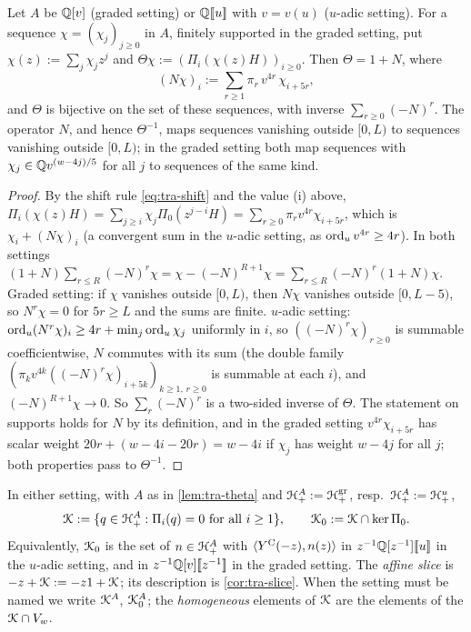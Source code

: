 \begin{lem}
\label{lem:tra-theta}
Let $A$ be $\mathbb{Q}[v]$ (graded setting) or $\mathbb{Q}[\![ u ]\!]$ with $v = v(u)$ ($u$-adic setting). For a sequence $\chi = (\chi_j)_{j\geq 0}$ in $A$, finitely supported in the graded setting, put $\chi(z) := \sum_j\chi_jz^j$ and $\Theta\chi := (\Pi_i(\chi(z)H))_{i\geq 0}$. Then $\Theta = 1+N$, where
\[
(N\chi)_i := \sum_{r\geq 1}\pi_r\,v^{4r}\,\chi_{i+5r},
\]
and $\Theta$ is bijective on the set of these sequences, with inverse $\sum_{r\geq 0}(-N)^r$. The operator $N$, and hence $\Theta^{-1}$, maps sequences vanishing outside $[0,L)$ to sequences vanishing outside $[0,L)$; in the graded setting both map sequences with $\chi_j\in\mathbb{Q} v^{(w-4j)/5}$ for all $j$ to sequences of the same kind.
\end{lem}

\begin{proof}
By the shift rule \eqref{eq:tra-shift} and the value (i) above, $\Pi_i(\chi(z)H) =\sum_{j\geq i}\chi_j\Pi_0(z^{j-i}H) = \sum_{r\geq 0}\pi_rv^{4r}\chi_{i+5r}$, which is $\chi_i+(N\chi)_i$ (a convergent sum in the $u$-adic setting, as $\operatorname{ord}_uv^{4r}\geq 4r$). In both settings $(1+N)\sum_{r\leq R}(-N)^r\chi = \chi-(-N)^{R+1}\chi = \sum_{r\leq R}(-N)^r(1+N)\chi$. Graded setting: if $\chi$ vanishes outside $[0,L)$, then $N\chi$ vanishes outside $[0,L-5)$, so $N^r\chi = 0$ for $5r\geq L$ and the sums are finite. $u$-adic setting: $\operatorname{ord}_u(N^r\chi)_i\geq 4r+\min_j\operatorname{ord}_u\chi_j$ uniformly in $i$, so $((-N)^r\chi)_{r\geq 0}$ is summable coefficientwise, $N$ commutes with its sum (the double family $(\pi_kv^{4k}((-N)^r\chi)_{i+5k})_{k\geq 1,\,r\geq 0}$ is summable at each $i$), and $(-N)^{R+1}\chi\to 0$. So $\sum_r(-N)^r$ is a two-sided inverse of $\Theta$. The statement on supports holds for $N$ by its definition, and in the graded setting $v^{4r}\chi_{i+5r}$ has scalar weight $20r+(w-4i-20r) = w-4i$ if $\chi_j$ has weight $w-4j$ for all $j$; both properties pass to $\Theta^{-1}$.
\end{proof}

\begin{defn}
\label{def:tra-slice}
In either setting, with $A$ as in \cref{lem:tra-theta} and $\mathcal{H}^A_+ := \mathcal{H}^{\mathrm{gr}}_+$, resp.\ $\mathcal{H}^A_+ := \mathcal{H}^u_+$,
\begin{equation}
\label{eq:tra-slice}
\mathcal{K} := \{q\in\mathcal{H}^A_+ : \Pi_i(q) = 0\ \text{for all } i\geq 1\},\qquad \mathcal{K}_{0} := \mathcal{K}\cap\ker\Pi_0 .
\end{equation}
Equivalently, $\mathcal{K}_{0}$ is the set of $n\in\mathcal{H}^A_+$ with $\langle Y^{\mathrm{C}}(-z),n(z)\rangle$ in $z^{-1}\mathbb{Q}[z^{-1}][\![ u ]\!]$ in the $u$-adic setting, and in $z^{-1}\mathbb{Q}[v][\![ z^{-1} ]\!]$ in the graded setting. The \emph{affine slice} is $-z+\mathcal{K} := -z1+\mathcal{K}$; its description is \cref{cor:tra-slice}. When the setting must be named we write $\mathcal{K}^A$, $\mathcal{K}_{0}^A$; the \emph{homogeneous} elements of $\mathcal{K}$ are the elements of the $\mathcal{K}\cap V_w$.
\end{defn}


